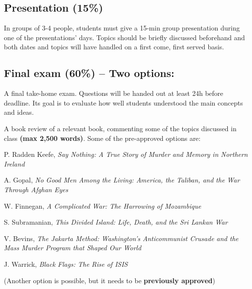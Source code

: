 \documentclass[12pt, a4paper]{article}
\begin{document}
\subsection*{Presentation (15\%)}

In groups of 3-4 people, students must give a 15-min group presentation during one of the presentations’ days.
Topics should be briefly discussed beforehand and both dates and topics will have handled on a first come, first served basis.

\subsection*{Final exam (60\%) -- Two options:}

\begin{itemize}
  \item[\textbf{A.}] A final take-home exam. Questions will be handed out at least 24h before deadline. Its goal is to evaluate how well students understood the main concepts and ideas.
  \item[\textbf{B.}] A book review of a relevant book, commenting some of the topics discussed in class \textbf{(max 2,500 words)}. Some of the pre-approved options are:
  {\small
  \item[-] P. Radden Keefe, \textit{Say Nothing: A True Story of Murder and Memory in Northern Ireland} \vspace{-10pt}
  \item[-] A. Gopal, \textit{No Good Men Among the Living: America, the Taliban, and the War Through Afghan Eyes} \vspace{-10pt}
  \item[-] W. Finnegan, \textit{A Complicated War: The Harrowing of Mozambique} \vspace{-10pt}
  \item[-] S. Subramanian, \textit{This Divided Island: Life, Death, and the Sri Lankan War} \vspace{-10pt}
  \item[-] V. Bevins, \textit{The Jakarta Method: Washington's Anticommunist Crusade and the Mass Murder Program that Shaped Our World} \vspace{-10pt}
  \item[-] J. Warrick, \textit{Black Flags: The Rise of ISIS}
  }
  \item[] (Another option is possible, but it needs to be \textbf{previously approved})
\end{itemize}

\newpage
\end{document}
